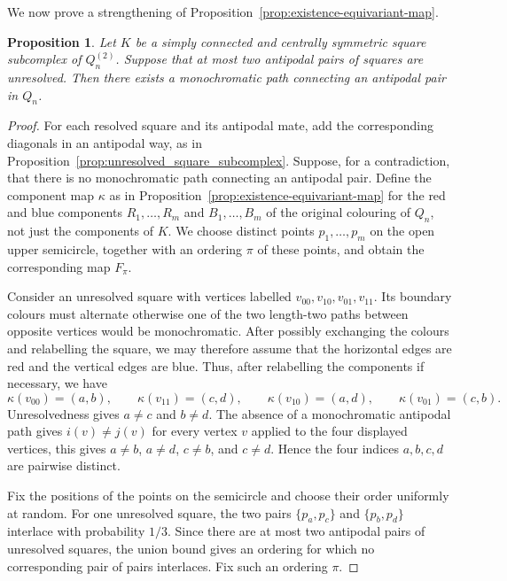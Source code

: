 \documentclass[12pt,UKenglish]{amsart}
\theoremstyle{plain}
\newtheorem{proposition}[proposition]{Proposition}
\theoremstyle{definition}
\theoremstyle{remark}
\begin{document}
We now prove a strengthening of Proposition~\ref{prop:existence-equivariant-map}.
\begin{proposition}\label{prop:2-unresolved}
Let $K$ be a simply connected and centrally symmetric square subcomplex of $Q_n^{(2)}$. Suppose that at most two antipodal pairs of squares are unresolved. Then there exists a monochromatic path connecting an antipodal pair in \(Q_n\).
\end{proposition}
\begin{proof}
For each resolved square and its antipodal mate, add the corresponding diagonals in an antipodal way, as in Proposition~\ref{prop:unresolved_square_subcomplex}. Suppose, for a contradiction, that there is no monochromatic path connecting an antipodal pair. Define the component map $\kappa$ as in Proposition~\ref{prop:existence-equivariant-map} for the red and blue components \(R_1,\dots,R_m\) and \(B_1,\dots,B_m\) of the original colouring of \(Q_n\), not just the components of $K$. We choose distinct points $p_1,\dots,p_m$ on the open upper semicircle, together with an ordering $\pi$ of these points, and obtain the corresponding map $F_\pi$.

Consider an unresolved square with vertices labelled $v_{00},v_{10},v_{01},v_{11}$. Its boundary colours must alternate otherwise one of the two length-two paths between opposite vertices would be monochromatic. After possibly exchanging the colours and relabelling the square, we may therefore assume that the horizontal edges are red and the vertical edges are blue. Thus, after relabelling the components if necessary, we have
\[
\kappa(v_{00})=(a,b),\qquad \kappa(v_{11})=(c,d),\qquad
\kappa(v_{10})=(a,d),\qquad \kappa(v_{01})=(c,b).
\]
Unresolvedness gives $a\neq c$ and $b\neq d$. The absence of a monochromatic antipodal path gives $i(v)\neq j(v)$ for every vertex $v$ applied to the four displayed vertices, this gives $a\neq b$, $a\neq d$, $c\neq b$, and $c\neq d$. Hence the four indices $a,b,c,d$ are pairwise distinct.

Fix the positions of the points on the semicircle and choose their order uniformly at random. For one unresolved square, the two pairs $\{p_a,p_c\}$ and $\{p_b,p_d\}$ interlace with probability $1/3$. Since there are at most two antipodal pairs of unresolved squares, the union bound gives an ordering for which no corresponding pair of pairs interlaces. Fix such an ordering $\pi$.


\end{proof}
\end{document}
